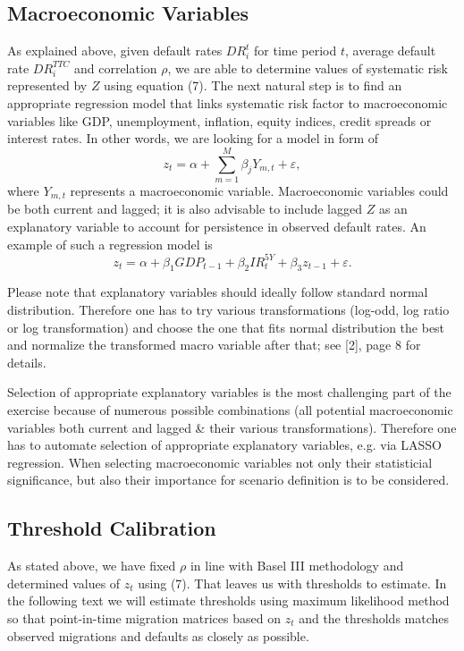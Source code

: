 \documentclass[a4paper]{article}
\begin{document}
\subsection{Macroeconomic Variables}

As explained above, given default rates $DR_i^t$ for time period $t$, average default rate $DR_i^{TTC}$ and
correlation $\rho$, we are able to determine values of systematic risk 
represented by $Z$ using equation (7). The next natural step is to find an appropriate 
regression model that links systematic risk factor to 
macroeconomic variables like GDP, unemployment, inflation, equity 
indices, credit spreads or interest rates. In other words, 
we are looking for a model in form of
\begin{equation}
z_t = \alpha + \sum_{m = 1}^M \beta_j Y_{m, t} + \varepsilon,
\end{equation}
where $Y_{m, t}$ represents a macroeconomic variable. 
Macroeconomic variables could be both current and lagged; it is also
advisable to include lagged $Z$ as an explanatory variable to account for persistence in observed default rates. An example 
of such a regression model is
\begin{equation}
z_t = \alpha + \beta_1 GDP_{t - 1} + \beta_2 IR^{5Y}_t + \beta_3 z_{t - 
1} + \varepsilon.
\end{equation}

Please note that explanatory variables should ideally follow standard normal 
distribution. Therefore one has to try various transformations 
(log-odd, log ratio or log transformation) and choose the one that fits 
normal distribution the best and normalize the transformed macro 
variable after that; see [2], page 8 for details.

Selection of appropriate explanatory variables is the most challenging 
part of the exercise because of numerous possible 
combinations (all potential macroeconomic variables both current and 
lagged \& their various transformations). Therefore one has to 
automate selection of appropriate explanatory variables, e.g. via LASSO 
regression. When selecting macroeconomic variables not only their statisticial significance, but also their importance
for scenario definition is to be considered.

\subsection{Threshold Calibration}

As stated above, we have fixed $\rho$ in line with Basel III methodology and 
determined values of $z_t$ using (7). That leaves us with thresholds 
to estimate. In the following text we will estimate thresholds using maximum likelihood method so 
that point-in-time migration matrices based on $z_t$ and the thresholds
matches observed migrations and defaults as closely as possible.
\end{document}
